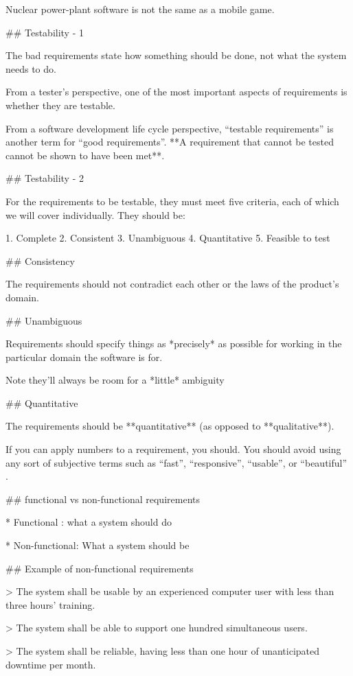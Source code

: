 Nuclear power-plant software is not the same as a mobile game.

## Testability - 1

The bad requirements state how something should be
done, not what the system needs to do.

From a tester’s perspective, one of the most important
aspects of requirements is whether they are testable.

From a software development life cycle perspective,
“testable requirements” is another term for “good
requirements”. **A requirement that cannot be tested
cannot be shown to have been met**.

## Testability - 2

For the requirements to be testable, they must meet five
criteria, each of which we will cover individually. They
should be:

1. Complete
2. Consistent
3. Unambiguous
4. Quantitative
5. Feasible to test

## Consistency

The requirements should not contradict each other or the laws of the
product's domain.

## Unambiguous

Requirements should specify things as *precisely* as possible for working
in the particular domain the software is for.

Note they'll always be room for a *little* ambiguity

## Quantitative

The requirements should be **quantitative** (as opposed to
**qualitative**).

If you can apply numbers to a requirement, you should.
You should avoid using any sort of subjective terms
such as “fast”, “responsive”, “usable”, or “beautiful” .


## functional vs non-functional requirements

* Functional : what a system should do

* Non-functional: What a system should be

## Example of non-functional requirements

> The system shall be usable by an experienced computer user
with less than three hours’ training.

\vfill

> The system shall be able to support one hundred simultaneous
users.

\vfill

> The system shall be reliable, having less than one hour of
unanticipated downtime per month.

